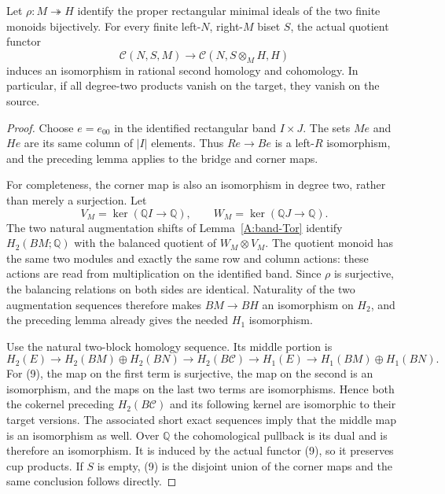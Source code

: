 \begin{proposition}
\label{CP2:A-band-quotient-collage-H2}
Let $\rho:M\twoheadrightarrow H$ identify the proper rectangular
minimal ideals of the two finite monoids bijectively.  For every
finite left-$N$, right-$M$ biset $S$, the actual quotient functor
\[
 \mathcal C(N,S,M)\longrightarrow
       \mathcal C(N,S\otimes_M H,H)                            \tag{9}
\]
induces an isomorphism in rational second homology and cohomology.
In particular, if all degree-two products vanish on the target,
they vanish on the source.
\end{proposition}
\begin{proof}
Choose $e=e_{00}$ in the identified rectangular band $I\times J$.
The sets $Me$ and $He$ are its same column of $|I|$ elements.
Thus $Re\to Be$ is a left-$R$ isomorphism, and the preceding lemma
applies to the bridge and corner maps.

For completeness, the corner map is also an isomorphism in degree
two, rather than merely a surjection.  Let
\[
 V_M=\ker(\mathbb QI\to\mathbb Q),\qquad
 W_M=\ker(\mathbb QJ\to\mathbb Q).
\]
The two natural augmentation shifts of Lemma~\ref{A:band-Tor} identify
$H_2(BM;\mathbb Q)$ with the balanced quotient of $W_M\otimes V_M$.
The quotient monoid has the same two modules and exactly the same
row and column actions: these actions are read from multiplication
on the identified band.  Since $\rho$ is surjective, the balancing
relations on both sides are identical.  Naturality of the two
augmentation sequences therefore makes $BM\to BH$ an isomorphism
on $H_2$, and the preceding lemma already gives the needed $H_1$
isomorphism.

Use the natural two-block homology sequence.  Its middle portion is
\[
 H_2(E)\longrightarrow H_2(BM)\oplus H_2(BN)
 \longrightarrow H_2(B\mathcal C)
 \longrightarrow H_1(E)
 \longrightarrow H_1(BM)\oplus H_1(BN).
                                                               \tag{10}
\]
For (9), the map on the first term is surjective, the map on the
second is an isomorphism, and the maps on the last two terms are
isomorphisms.  Hence both the cokernel preceding $H_2(B\mathcal C)$
and its following kernel are isomorphic to their target versions.
The associated short exact sequences imply that the middle map is
an isomorphism as well.  Over $\mathbb Q$ the cohomological pullback
is its dual and is therefore an isomorphism.  It is induced by the
actual functor (9), so it preserves cup products.
If $S$ is empty, (9) is the disjoint union of the corner maps and
the same conclusion follows directly.
\end{proof}

